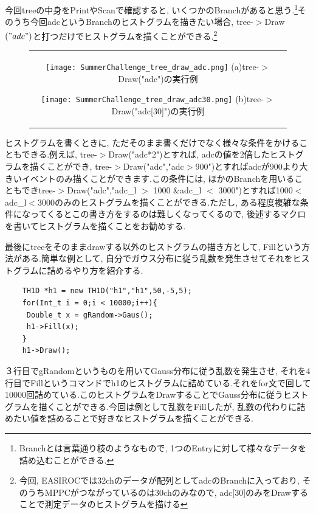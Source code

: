 今回treeの中身をPrintやScanで確認すると, いくつかのBranchがあると思う.\footnote{Branchとは言葉通り枝のようなもので, 1つのEntryに対して様々なデータを詰め込むことができる.}そのうち今回adcというBranchのヒストグラムを描きたい場合, tree-$>$Draw$\left("adc"\right)$と打つだけでヒストグラムを描くことができる.\footnote{今回, EASIROCでは32chのデータが配列としてadcのBranchに入っており, そのうちMPPCがつながっているのは30chのみなので, adc[30]のみをDrawすることで測定データのヒストグラムを描ける}
\begin{figure}[htbp]
  \begin{center}
    \begin{tabular}{c}

      \begin{minipage}{0.5\hsize}
        \begin{center}
          \texttt{[image: SummerChallenge\_tree\_draw\_adc.png]}
          \hspace{1.6cm} (a)tree-$>$Draw("adc")の実行例
        \end{center}
      \end{minipage}

      \begin{minipage}{0.5\hsize}
        \begin{center}
          \texttt{[image: SummerChallenge\_tree\_draw\_adc30.png]}
          \hspace{1.6cm} (b)tree-$>$Draw("adc[30]")の実行例
        \end{center}
      \end{minipage}
    \end{tabular}
    \label{fig:tree_draw}
  \end{center}
\end{figure}

ヒストグラムを書くときに, ただそのまま書くだけでなく様々な条件をかけることもできる.例えば, tree-$>$Draw("adc*2")とすれば, adcの値を2倍したヒストグラムを描くことができ, tree-$>$Draw("adc","adc$>$900")とすればadcが900より大きいイベントのみ描くことができます.この条件には, ほかのBranchを用いることもできtree-$>$Draw("adc","adc\_l $>$ 1000 \&adc\_l $<$ 3000")とすれば1000$<$adc\_l$<$3000のみのヒストグラムを描くことができる.ただし, ある程度複雑な条件になってくるとこの書き方をするのは難しくなってくるので, 後述するマクロを書いてヒストグラムを描くことをお勧めする.

最後にtreeをそのままdrawする以外のヒストグラムの描き方として, Fillという方法がある.簡単な例として, 自分でガウス分布に従う乱数を発生させてそれをヒストグラムに詰めるやり方を紹介する.
\begin{lstlisting}
    TH1D *h1 = new TH1D("h1","h1",50,-5,5);
    for(Int_t i = 0;i < 10000;i++){
     Double_t x = gRandom->Gaus();
     h1->Fill(x);
    }
    h1->Draw();
 \end{lstlisting}
３行目でgRandomというものを用いてGauss分布に従う乱数を発生させ, それを4行目でFillというコマンドでh1のヒストグラムに詰めている.それをfor文で回して10000回詰めている.このヒストグラムをDrawすることでGauss分布に従うヒストグラムを描くことができる.今回は例として乱数をFillしたが, 乱数の代わりに詰めたい値を詰めることで好きなヒストグラムを描くことができる.

